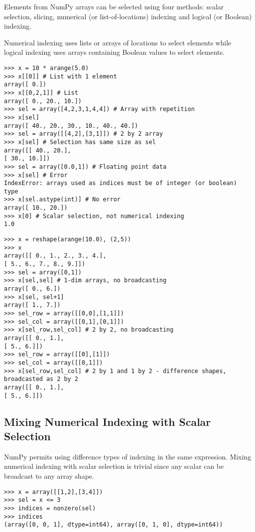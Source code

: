 Elements from NumPy arrays can be selected using four methods: scalar selection, slicing, numerical (or
list-of-locations) indexing and logical (or Boolean) indexing.

Numerical indexing uses lists or arrays of locations
to select elements while logical indexing uses arrays containing Boolean values to select elements.


\begin{verbatim}
>>> x = 10 * arange(5.0)
>>> x[[0]] # List with 1 element
array([ 0.])
>>> x[[0,2,1]] # List
array([ 0., 20., 10.])
>>> sel = array([4,2,3,1,4,4]) # Array with repetition
>>> x[sel]
array([ 40., 20., 30., 10., 40., 40.])
>>> sel = array([[4,2],[3,1]]) # 2 by 2 array
>>> x[sel] # Selection has same size as sel
array([[ 40., 20.],
[ 30., 10.]])
>>> sel = array([0.0,1]) # Floating point data
>>> x[sel] # Error
IndexError: arrays used as indices must be of integer (or boolean) type
>>> x[sel.astype(int)] # No error
array([ 10., 20.])
>>> x[0] # Scalar selection, not numerical indexing
1.0

\end{verbatim}


\begin{verbatim}
>>> x = reshape(arange(10.0), (2,5))
>>> x
array([[ 0., 1., 2., 3., 4.],
[ 5., 6., 7., 8., 9.]])
>>> sel = array([0,1])
>>> x[sel,sel] # 1-dim arrays, no broadcasting
array([ 0., 6.])
>>> x[sel, sel+1]
array([ 1., 7.])
>>> sel_row = array([[0,0],[1,1]])
>>> sel_col = array([[0,1],[0,1]])
>>> x[sel_row,sel_col] # 2 by 2, no broadcasting
array([[ 0., 1.],
[ 5., 6.]])
>>> sel_row = array([[0],[1]])
>>> sel_col = array([[0,1]])
>>> x[sel_row,sel_col] # 2 by 1 and 1 by 2 - difference shapes, broadcasted as 2 by 2
array([[ 0., 1.],
[ 5., 6.]])

\end{verbatim}
\subsection{Mixing Numerical Indexing with Scalar Selection}
NumPy permits using difference types of indexing in the same expression. Mixing numerical indexing
with scalar selection is trivial since any scalar can be broadcast to any array shape.


\begin{framed}
\begin{verbatim}
>>> x = array([[1,2],[3,4]])
>>> sel = x <= 3
>>> indices = nonzero(sel)
>>> indices
(array([0, 0, 1], dtype=int64), array([0, 1, 0], dtype=int64))
\end{verbatim}
\end{framed}

